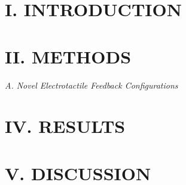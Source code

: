 \begin{multicols}{2}
	
	
		
%	
	
	\section*{I. INTRODUCTION}%
	
	
	
	
	
	\section*{II. METHODS}%
	
	\textit{A. Novel Electrotactile Feedback Configurations}
	
	
	
	\section*{IV. RESULTS}%
	
	
	\section*{V. DISCUSSION}%
	
	

\end{multicols}
